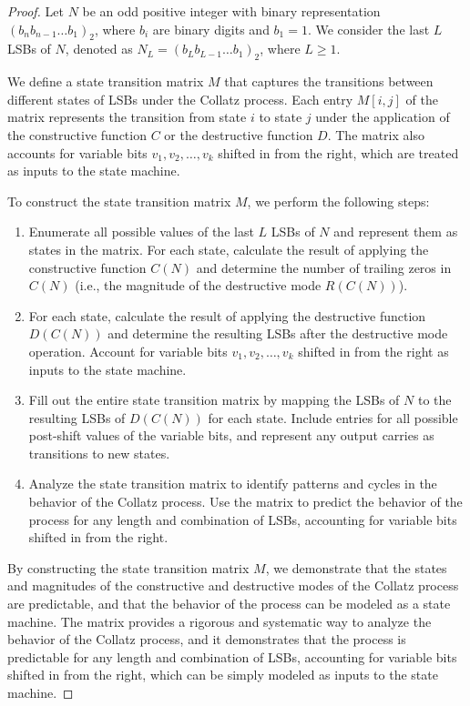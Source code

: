 \documentclass{article}
\theoremstyle{definition}
\begin{document}
\begin{proof}
Let \( N \) be an odd positive integer with binary representation \( (b_n b_{n-1} \ldots b_1)_2 \), where \( b_i \) are binary digits and \( b_1 = 1 \). We consider the last \( L \) LSBs of \( N \), denoted as \( N_L = (b_L b_{L-1} \ldots b_1)_2 \), where \( L \geq 1 \).

We define a state transition matrix \( M \) that captures the transitions between different states of LSBs under the Collatz process. Each entry \( M[i, j] \) of the matrix represents the transition from state \( i \) to state \( j \) under the application of the constructive function \( C \) or the destructive function \( D \). The matrix also accounts for variable bits \( v_1, v_2, \ldots, v_k \) shifted in from the right, which are treated as inputs to the state machine.

To construct the state transition matrix \( M \), we perform the following steps:

\begin{enumerate}
  \item Enumerate all possible values of the last \( L \) LSBs of \( N \) and represent them as states in the matrix. For each state, calculate the result of applying the constructive function \( C(N) \) and determine the number of trailing zeros in \( C(N) \) (i.e., the magnitude of the destructive mode \( R(C(N)) \)).
  \item For each state, calculate the result of applying the destructive function \( D(C(N)) \) and determine the resulting LSBs after the destructive mode operation. Account for variable bits \( v_1, v_2, \ldots, v_k \) shifted in from the right as inputs to the state machine.
  \item Fill out the entire state transition matrix by mapping the LSBs of \( N \) to the resulting LSBs of \( D(C(N)) \) for each state. Include entries for all possible post-shift values of the variable bits, and represent any output carries as transitions to new states.
  \item Analyze the state transition matrix to identify patterns and cycles in the behavior of the Collatz process. Use the matrix to predict the behavior of the process for any length and combination of LSBs, accounting for variable bits shifted in from the right.
\end{enumerate}

By constructing the state transition matrix \( M \), we demonstrate that the states and
magnitudes of the constructive and destructive modes of the Collatz process are predictable, and that the behavior of the process can be modeled as a state machine. The matrix provides a rigorous and systematic way to analyze the behavior of the Collatz process, and it demonstrates that the process is predictable for any length and combination of LSBs, accounting for variable bits shifted in from the right, which can be simply modeled as inputs to the state machine.


\end{proof}
\end{document}
